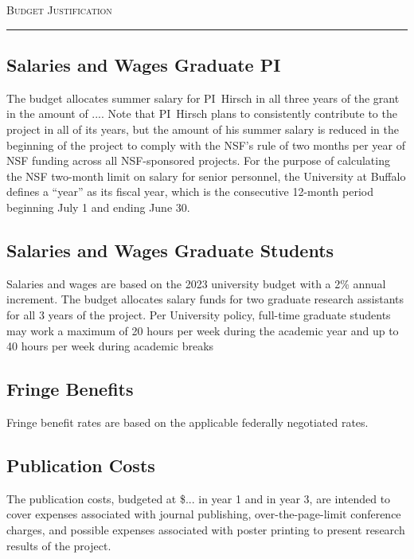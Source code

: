 



\begin{center}
{\LARGE \textsc{Budget Justification}}
\end{center}
\hrule
\vspace{3mm}


\subsection*{Salaries and Wages Graduate PI}
The budget allocates summer salary for PI~Hirsch in all three years of the grant in the amount of ....
Note that PI~Hirsch plans to consistently contribute to the project in all of its years, but the amount of his summer salary is reduced in the beginning of the project to comply with the NSF's rule of two months per year of NSF funding across all NSF-sponsored projects.
For the purpose of calculating the NSF two-month limit on salary for senior personnel, the University at Buffalo defines a ``year'' as its fiscal year, which is the consecutive 12-month period beginning July 1 and ending June 30.


\subsection*{Salaries and Wages Graduate Students}
Salaries and wages are based on the 2023 university budget with a 2\% annual increment.
The budget allocates salary funds for two graduate research assistants for all 3 years of the project. 
Per University policy, full-time graduate students may work a maximum of 20 hours per week during the academic year and up to 40 hours per week during academic breaks

\subsection*{Fringe Benefits}

Fringe benefit rates are based on the applicable federally negotiated rates.

\subsection*{Publication Costs}
The publication costs, budgeted at \$... in year 1 and in year 3, are intended to cover expenses associated with journal publishing, over-the-page-limit conference charges, and possible expenses associated with poster printing to present research results of the project.

